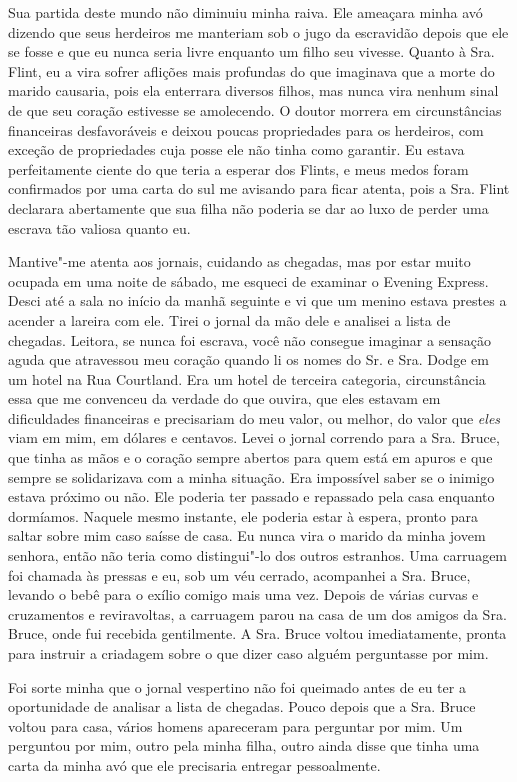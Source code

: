 Sua partida deste mundo não diminuiu
minha raiva. Ele ameaçara minha avó dizendo que seus herdeiros me
manteriam sob o jugo da escravidão depois que ele se fosse e que eu
nunca seria livre enquanto um filho seu vivesse. Quanto à Sra. Flint, eu
a vira sofrer aflições mais profundas do que imaginava que a morte do
marido causaria, pois ela enterrara diversos filhos, mas nunca vira
nenhum sinal de que seu coração estivesse se amolecendo. O doutor
morrera em circunstâncias financeiras desfavoráveis e deixou poucas
propriedades para os herdeiros, com exceção de propriedades cuja posse
ele não tinha como garantir. Eu estava perfeitamente ciente do que teria
a esperar dos Flints, e meus medos foram confirmados por uma carta do
sul me avisando para ficar atenta, pois a Sra. Flint declarara
abertamente que sua filha não poderia se dar ao luxo de perder uma
escrava tão valiosa quanto eu.

Mantive"-me atenta aos jornais, cuidando
as chegadas, mas por estar muito ocupada em uma noite de sábado, me
esqueci de examinar o Evening Express. Desci até a sala no início da
manhã seguinte e vi que um menino estava prestes a acender a lareira com
ele. Tirei o jornal da mão dele e analisei a lista de chegadas. Leitora,
se nunca foi escrava, você não consegue imaginar a sensação aguda que
atravessou meu coração quando li os nomes do Sr. e Sra. Dodge em um
hotel na Rua Courtland. Era um hotel de terceira categoria,
circunstância essa que me convenceu da verdade do que ouvira, que eles
estavam em dificuldades financeiras e precisariam do meu valor, ou
melhor, do valor que \emph{eles} viam em mim, em dólares e centavos.
Levei o jornal correndo para a Sra. Bruce, que tinha as mãos e o coração
sempre abertos para quem está em apuros e que sempre se solidarizava com
a minha situação. Era impossível saber se o inimigo estava próximo ou
não. Ele poderia ter passado e repassado pela casa enquanto dormíamos.
Naquele mesmo instante, ele poderia estar à espera, pronto para saltar
sobre mim caso saísse de casa. Eu nunca vira o marido da minha jovem
senhora, então não teria como distingui"-lo dos outros estranhos. Uma
carruagem foi chamada às pressas e eu, sob um véu cerrado, acompanhei a
Sra. Bruce, levando o bebê para o exílio comigo mais uma vez. Depois de
várias curvas e cruzamentos e reviravoltas, a carruagem parou na casa de
um dos amigos da Sra. Bruce, onde fui recebida gentilmente. A Sra. Bruce
voltou imediatamente, pronta para instruir a criadagem sobre o que dizer
caso alguém perguntasse por mim.

Foi sorte minha que o jornal vespertino
não foi queimado antes de eu ter a oportunidade de analisar a lista de
chegadas. Pouco depois que a Sra. Bruce voltou para casa, vários homens
apareceram para perguntar por mim. Um perguntou por mim, outro pela
minha filha, outro ainda disse que tinha uma carta da minha avó que ele
precisaria entregar pessoalmente.

